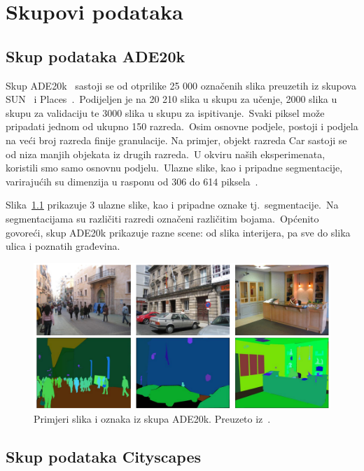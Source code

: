\documentclass[times, utf8, seminar, numeric]{fer}
\begin{document}
\chapter{Skupovi podataka}

\section{Skup podataka ADE20k}

Skup ADE20k~\cite{zhou2019semantic} sastoji se od otprilike 25 000 označenih slika preuzetih iz skupova SUN~\cite{xiao2010sun} i Places~\cite{zhou2017places}.\ 
Podijeljen je na 20 210 slika u skupu za učenje, 2000 slika u skupu za validaciju te 3000 slika u skupu za ispitivanje.\ Svaki piksel može pripadati jednom od ukupno 150 razreda.\ 
Osim osnovne podjele, postoji i podjela na veći broj razreda finije granulacije. Na primjer, objekt razreda Car sastoji se od niza manjih objekata iz drugih razreda.\ 
U okviru naših eksperimenata, koristili smo samo osnovnu podjelu.\ Ulazne slike, kao i pripadne segmentacije, varirajućih su dimenzija u rasponu od 306 do 614 piksela~\cite{bevandic2020multi}.\ 
  
Slika~\ref{fig:ade20k} prikazuje 3 ulazne slike, kao i pripadne oznake tj.\ segmentacije.\ 
Na segmentacijama su različiti razredi označeni različitim bojama.\ 
Općenito govoreći, skup ADE20k prikazuje razne scene: od slika interijera, pa sve do slika ulica i poznatih građevina.\ 

\begin{figure}[h]
    \centering
    \includegraphics[scale=1.5]{./Slike/ade20k.png}
    \caption{Primjeri slika i oznaka iz skupa ADE20k. Preuzeto iz~\cite{zhou2019semantic}.}
    \label{fig:ade20k}
\end{figure}

\section{Skup podataka Cityscapes}
\end{document}
